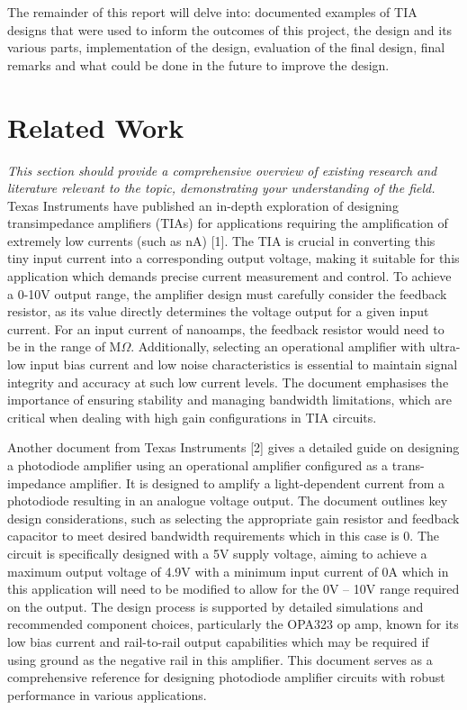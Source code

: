 \documentclass[conference]{IEEEtran}
\begin{document}
The remainder of this report will delve into: documented examples of TIA designs that were used to inform the outcomes of this project, the design and its various parts, implementation of the design, evaluation of the final design, final remarks and what could be done in the future to improve the design.

\section{Related Work}

\textit{This section should provide a comprehensive overview of existing research and literature relevant to the topic, demonstrating your understanding of the field.} \\

Texas Instruments have published an in-depth exploration of designing transimpedance amplifiers (TIAs) for applications requiring the amplification of extremely low currents (such as nA) [1]. The TIA is crucial in converting this tiny input current into a corresponding output voltage, making it suitable for this application which demands precise current measurement and control. To achieve a 0-10V output range, the amplifier design must carefully consider the feedback resistor, as its value directly determines the voltage output for a given input current. For an input current of nanoamps, the feedback resistor would need to be in the range of M$\Omega$. Additionally, selecting an operational amplifier with ultra-low input bias current and low noise characteristics is essential to maintain signal integrity and accuracy at such low current levels. The document emphasises the importance of ensuring stability and managing bandwidth limitations, which are critical when dealing with high gain configurations in TIA circuits.

Another document from Texas Instruments [2] gives a detailed guide on designing a photodiode amplifier using an operational amplifier configured as a trans-impedance amplifier. It is designed to amplify a light-dependent current from a photodiode resulting in an analogue voltage output. The document outlines key design considerations, such as selecting the appropriate gain resistor and feedback capacitor to meet desired bandwidth requirements which in this case is 0. The circuit is specifically designed with a 5V supply voltage, aiming to achieve a maximum output voltage of 4.9V with a minimum input current of 0A which in this application will need to be modified to allow for the 0V – 10V range required on the output. The design process is supported by detailed simulations and recommended component choices, particularly the OPA323 op amp, known for its low bias current and rail-to-rail output capabilities which may be required if using ground as the negative rail in this amplifier. This document serves as a comprehensive reference for designing photodiode amplifier circuits with robust performance in various applications.
\end{document}
